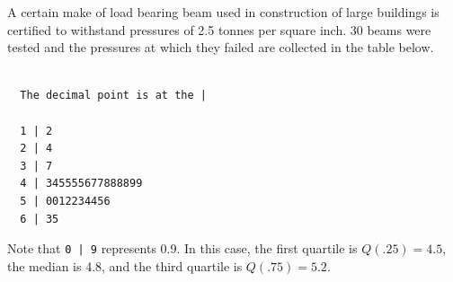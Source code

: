 \documentclass[addpoints]{examsetup}\usepackage[]{graphicx}\usepackage[]{color}
\makeatletter
\newenvironment{kframe}{%
 \def\at@end@of@kframe{}%
 \ifinner\ifhmode%
  \def\at@end@of@kframe{\end{minipage}}%
  \begin{minipage}{\columnwidth}%
 \fi\fi%
 \def\FrameCommand##1{\hskip\@totalleftmargin \hskip-\fboxsep
 \colorbox{shadecolor}{##1}\hskip-\fboxsep
     \hskip-\linewidth \hskip-\@totalleftmargin \hskip\columnwidth}%
 \MakeFramed {\advance\hsize-\width
   \@totalleftmargin\z@ \linewidth\hsize
   \@setminipage}}%
 {\par\unskip\endMakeFramed%
 \at@end@of@kframe}
\newenvironment{knitrout}{}{} %
\makeatother
\begin{document}
\begin{questions}
\question 



A certain make of load bearing beam used in construction of large buildings is certified to withstand pressures of 2.5 tonnes per square inch.
30 beams were tested and the pressures at which they failed are collected in the table below.

\begin{knitrout}
\color{fgcolor}\begin{kframe}
\begin{verbatim}

  The decimal point is at the |

  1 | 2
  2 | 4
  3 | 7
  4 | 345555677888899
  5 | 0012234456
  6 | 35
\end{verbatim}
\end{kframe}
\end{knitrout}

Note that \verb!0 | 9! represents 0.9. In this case, the first quartile is $Q(.25) = 4.5$, 
the median is 4.8, and the third quartile is $Q(.75) = 5.2$.

\end{questions}
\end{document}
